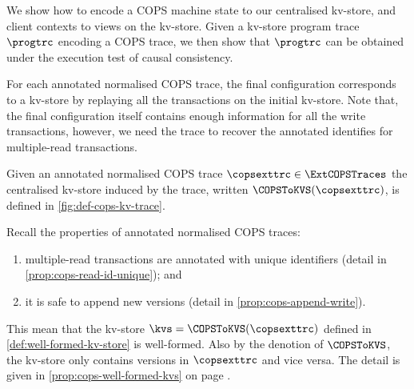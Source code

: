 We show how to encode a COPS machine state to our centralised kv-store,
and client contexts to views on the kv-store.
Given a kv-store program trace \( \progtrc \) encoding a COPS trace, 
we then show that \( \progtrc \) can be obtained under the execution test of causal consistency.

For each annotated normalised COPS trace,
the final configuration corresponds to a kv-store by replaying all the transactions on the initial kv-store.
Note that, the final configuration itself contains enough information for all the write transactions,
however, we need the trace to recover the annotated identifies for multiple-read transactions.

\begin{definition}
Given an annotated normalised COPS trace \( \copsexttrc \in \ExtCOPSTraces \) 
the centralised kv-store induced by the trace, written \( \COPSToKVS(\copsexttrc) \), is defined in \cref{fig:def-cops-kv-trace}.
\end{definition}



Recall the properties of annotated normalised COPS traces:
\begin{enumerate}
\item multiple-read transactions are annotated with unique identifiers (detail in \cref{prop:cops-read-id-unique});
and \item it is safe to append new versions (detail in \cref{prop:cops-append-write}).
\end{enumerate}
This mean that the kv-store \( \kvs  = \COPSToKVS(\copsexttrc) \) defined in \cref{def:well-formed-kv-store} is well-formed.
Also by the denotion of \( \COPSToKVS \), the kv-store only contains versions in \( \copsexttrc \) and vice versa.
The detail is given in \cref{prop:cops-well-formed-kvs} on page \pageref{sec:cops-well-formed-encoded-kv-store}.

